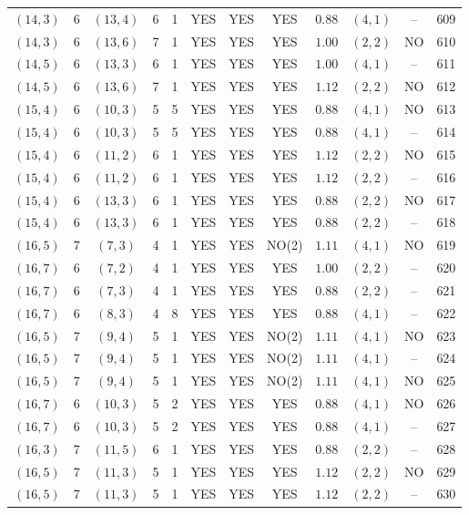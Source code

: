 \begin{longtable}{|c|c|c|c|c|c|c|c|c|c|c|c|}
$(14,3)$ & 6 & $(13,4)$ & 6 & 1 & YES & YES & YES & $0.88$ & $(4,1)$ & -- & 609\\
$(14,3)$ & 6 & $(13,6)$ & 7 & 1 & YES & YES & YES & $1.00$ & $(2,2)$ & NO & 610\\
$(14,5)$ & 6 & $(13,3)$ & 6 & 1 & YES & YES & YES & $1.00$ & $(4,1)$ & -- & 611\\
$(14,5)$ & 6 & $(13,6)$ & 7 & 1 & YES & YES & YES & $1.12$ & $(2,2)$ & NO & 612\\
$(15,4)$ & 6 & $(10,3)$ & 5 & 5 & YES & YES & YES & $0.88$ & $(4,1)$ & NO & 613\\
$(15,4)$ & 6 & $(10,3)$ & 5 & 5 & YES & YES & YES & $0.88$ & $(4,1)$ & -- & 614\\
$(15,4)$ & 6 & $(11,2)$ & 6 & 1 & YES & YES & YES & $1.12$ & $(2,2)$ & NO & 615\\
$(15,4)$ & 6 & $(11,2)$ & 6 & 1 & YES & YES & YES & $1.12$ & $(2,2)$ & -- & 616\\
$(15,4)$ & 6 & $(13,3)$ & 6 & 1 & YES & YES & YES & $0.88$ & $(2,2)$ & NO & 617\\
$(15,4)$ & 6 & $(13,3)$ & 6 & 1 & YES & YES & YES & $0.88$ & $(2,2)$ & -- & 618\\
$(16,5)$ & 7 & $(7,3)$ & 4 & 1 & YES & YES & NO(2) & $1.11$ & $(4,1)$ & NO & 619\\
$(16,7)$ & 6 & $(7,2)$ & 4 & 1 & YES & YES & YES & $1.00$ & $(2,2)$ & -- & 620\\
$(16,7)$ & 6 & $(7,3)$ & 4 & 1 & YES & YES & YES & $0.88$ & $(2,2)$ & -- & 621\\
$(16,7)$ & 6 & $(8,3)$ & 4 & 8 & YES & YES & YES & $0.88$ & $(4,1)$ & -- & 622\\
$(16,5)$ & 7 & $(9,4)$ & 5 & 1 & YES & YES & NO(2) & $1.11$ & $(4,1)$ & NO & 623\\
$(16,5)$ & 7 & $(9,4)$ & 5 & 1 & YES & YES & NO(2) & $1.11$ & $(4,1)$ & -- & 624\\
$(16,5)$ & 7 & $(9,4)$ & 5 & 1 & YES & YES & NO(2) & $1.11$ & $(4,1)$ & NO & 625\\
$(16,7)$ & 6 & $(10,3)$ & 5 & 2 & YES & YES & YES & $0.88$ & $(4,1)$ & NO & 626\\
$(16,7)$ & 6 & $(10,3)$ & 5 & 2 & YES & YES & YES & $0.88$ & $(4,1)$ & -- & 627\\
$(16,3)$ & 7 & $(11,5)$ & 6 & 1 & YES & YES & YES & $0.88$ & $(2,2)$ & -- & 628\\
$(16,5)$ & 7 & $(11,3)$ & 5 & 1 & YES & YES & YES & $1.12$ & $(2,2)$ & NO & 629\\
$(16,5)$ & 7 & $(11,3)$ & 5 & 1 & YES & YES & YES & $1.12$ & $(2,2)$ & -- & 630\\

\end{longtable}

